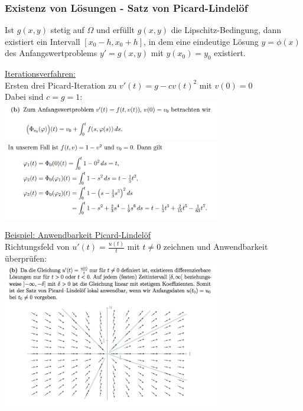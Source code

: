 \documentclass[6pt]{article}
\begin{document}
\begin{multicols*}{3}
		\vspace{10mm}
		\quad
		
		
		
		\columnbreak
		\subsubsection*{Existenz von L{\"o}sungen - Satz von Picard-Lindel{\"o}f}

		Ist $g(x,y)$ stetig auf $\Omega $ und erf{\"u}llt $g(x,y)$ die Lipschitz-Bedingung, dann existiert ein Intervall $[x_0 - h, x_0+h]$, in dem eine eindeutige L{\"o}sung $y=\phi(x)$ des Anfangswertproblems $y' = g(x,y)$ mit $y(x_0) = y_0$ existiert.
		
		\underline{Iterationsverfahren:}\vspace{1mm}  \\
		Ersten drei Picard-Iteration zu $v'(t) = g-cv(t)^2$ mit $v(0)=0$ \\
		Dabei sind $c=g=1$: \vspace{3mm} \\
		\includegraphics[width=270pt]{images/picarditeration1}
		\includegraphics[width=270pt]{images/picarditeration2}
		
		
			\underline{Beispiel: Anwendbarkeit Picard-Lindel{\"o}f} \vspace{1mm} \\
			Richtungsfeld von $u'(t) = \frac{u(t)}{t}$ mit $t\not = 0$   zeichnen und Anwendbarkeit {\"u}berpr{\"u}fen: \\
			\includegraphics[width=270pt]{images/picardlindeloef1}
			

\end{multicols*}
\end{document}
